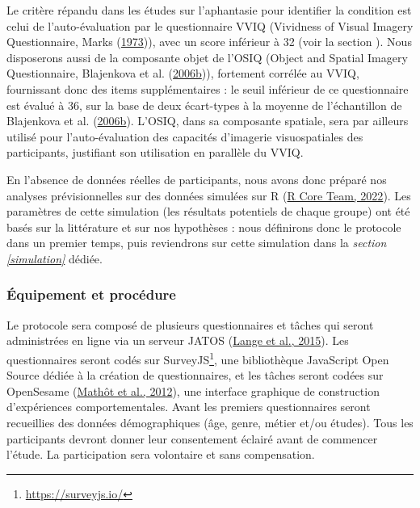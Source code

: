 \documentclass[
  12pt,
]{article}
\DeclareRobustCommand{\href}[2]{#2\footnote{\url{#1}}}
\begin{document}
Le critère répandu dans les études sur l'aphantasie pour identifier la
condition est celui de l'auto-évaluation par le questionnaire VVIQ
(Vividness of Visual Imagery Questionnaire, Marks
(\protect\hyperlink{ref-marksVividnessVisualImagery1973}{1973})), avec
un score inférieur à 32 (voir la section
\emph{}). Nous disposerons aussi de la
composante objet de l'OSIQ (Object and Spatial Imagery Questionnaire,
Blajenkova et al.
(\protect\hyperlink{ref-blajenkovaObjectspatialImageryNew2006}{2006b})),
fortement corrélée au VVIQ, fournissant donc des items supplémentaires :
le seuil inférieur de ce questionnaire est évalué à 36, sur la base de
deux écart-types à la moyenne de l'échantillon de Blajenkova et al.
(\protect\hyperlink{ref-blajenkovaObjectspatialImageryNew2006}{2006b}).
L'OSIQ, dans sa composante spatiale, sera par ailleurs utilisé pour
l'auto-évaluation des capacités d'imagerie visuospatiales des
participants, justifiant son utilisation en parallèle du VVIQ.

En l'absence de données réelles de participants, nous avons donc préparé
nos analyses prévisionnelles sur des données simulées sur R
(\protect\hyperlink{ref-R-base}{R Core Team, 2022}). Les paramètres de
cette simulation (les résultats potentiels de chaque groupe) ont été
basés sur la littérature et sur nos hypothèses : nous définirons donc le
protocole dans un premier temps, puis reviendrons sur cette simulation
dans la \emph{section \ref{simulation}} dédiée.

\hypertarget{uxe9quipement-et-procuxe9dure}{%
\subsubsection{Équipement et
procédure}\label{uxe9quipement-et-procuxe9dure}}

Le protocole sera composé de plusieurs questionnaires et tâches qui
seront administrées en ligne via un serveur JATOS
(\protect\hyperlink{ref-langeJustAnotherTool2015}{Lange et al., 2015}).
Les questionnaires seront codés sur
\href{https://surveyjs.io/}{SurveyJS}, une bibliothèque JavaScript Open
Source dédiée à la création de questionnaires, et les tâches seront
codées sur OpenSesame
(\protect\hyperlink{ref-mathotOpenSesameOpensourceGraphical2012}{Mathôt
et al., 2012}), une interface graphique de construction d'expériences
comportementales. Avant les premiers questionnaires seront recueillies
des données démographiques (âge, genre, métier et/ou études). Tous les
participants devront donner leur consentement éclairé avant de commencer
l'étude. La participation sera volontaire et sans compensation.
\end{document}
